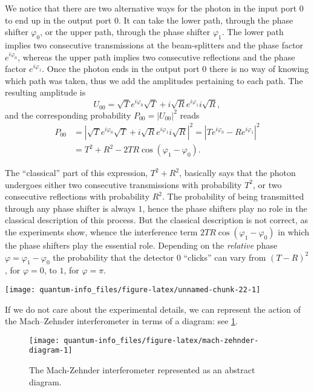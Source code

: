 \documentclass{article}
\begin{document}
We notice that there are two alternative ways for the photon in the input port \(0\) to end up in the output port \(0\).
It can take the lower path, through the phase shifter \(\varphi_0\), or the upper path, through the phase shifter \(\varphi_1\).
The lower path implies two consecutive transmissions at the beam-splitters and the phase factor \(e^{i\varphi_0}\), whereas the upper path implies two consecutive reflections and the phase factor \(e^{i\varphi_1}\).
Once the photon ends in the output port \(0\) there is no way of knowing which path was taken, thus we add the amplitudes pertaining to each path.
The resulting amplitude is
\[
  U_{00}
  = \sqrt{T} e^{i\varphi_0} \sqrt{T}
  + i\sqrt{R} e^{i\varphi_1} i \sqrt{R},
\]
and the corresponding probability \(P_{00}=|U_{00}|^2\) reads
\[
  \begin{aligned}
    P_{00}
    & = \left\vert
          \sqrt{T}e^{i\varphi_0}\sqrt{T} + i\sqrt{R}e^{i\varphi_1}i\sqrt{R}
        \right\vert^2
      = \left\vert
          Te^{i\varphi_0} - Re^{i\varphi_1}
        \right\vert^2
  \\& = T^2 + R^2
        - 2TR\cos(\varphi_1-\varphi_0).
  \end{aligned}
\]

The ``classical'' part of this expression, \(T^2+R^2\), basically says that the photon undergoes either two consecutive transmissions with probability \(T^2\), or two consecutive reflections with probability \(R^2\).
The probability of being transmitted through any phase shifter is always \(1\), hence the phase shifters play no role in the classical description of this process.
But the classical description is not correct, as the experiments show, whence the interference term \(2TR\cos(\varphi_1-\varphi_0)\) in which the phase shifters play the essential role.
Depending on the \emph{relative} phase \(\varphi=\varphi_1-\varphi_0\) the probability that the detector \(0\) ``clicks'' can vary from \((T-R)^2\), for \(\varphi=0\), to \(1\), for \(\varphi=\pi\).

\begin{center}\texttt{[image: quantum-info\_files/figure-latex/unnamed-chunk-22-1]} \end{center}

If we do not care about the experimental details, we can represent the action of the Mach--Zehnder interferometer in terms of a diagram: see \ref{fig:mach-zehnder-diagram}.

\begin{figure}[H]

{\centering \texttt{[image: quantum-info\_files/figure-latex/mach-zehnder-diagram-1]} 

}

\caption{The Mach-Zehnder interferometer represented as an abstract diagram.}\label{fig:mach-zehnder-diagram}
\end{figure}
\end{document}
